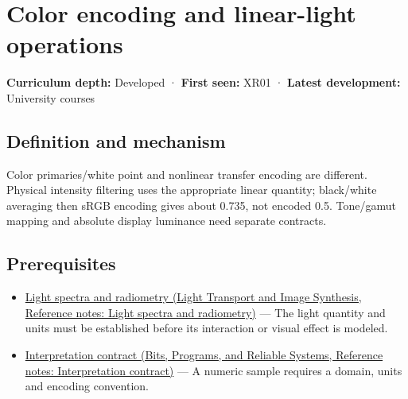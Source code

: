 \hypertarget{appendix-a9f83ad40792}{}\label{referencestart:appendix-a9f83ad40792}
\section{Color encoding and linear-light operations}\label{appendix-a9f83ad40792-color-encoding-and-linear-light-operations}

\hypertarget{appendix-a9f83ad40792-color-encoding-and-linear-light-operations}{}

\textbf{Curriculum depth:} Developed · \textbf{First seen:} XR01 · \textbf{Latest development:} University courses

\begin{allmightroledefinition}

\subsection{Definition and mechanism}\label{appendix-a9f83ad40792-definition-and-mechanism}

\hypertarget{appendix-a9f83ad40792-definition-and-mechanism}{}

Color primaries/white point and nonlinear transfer encoding are different. Physical intensity filtering uses the appropriate linear quantity; black/white averaging then sRGB encoding gives about 0.735, not encoded 0.5. Tone/gamut mapping and absolute display luminance need separate contracts.

\end{allmightroledefinition}

\subsection{Prerequisites}\label{appendix-a9f83ad40792-prerequisites}

\hypertarget{appendix-a9f83ad40792-prerequisites}{}

\begin{itemize}
\tightlist
\item
  \href{../04-Light-Transport-and-Image-Synthesis/main.pdf\#nameddest=appendix-215c2570199b}{Light spectra and radiometry (Light Transport and Image Synthesis, Reference notes: Light spectra and radiometry)} --- The light quantity and units must be established before its interaction or visual effect is modeled.
\item
  \href{../01-Bits-Programs-and-Reliable-Systems/main.pdf\#nameddest=appendix-f414bd4ed05c}{Interpretation contract (Bits, Programs, and Reliable Systems, Reference notes: Interpretation contract)} --- A numeric sample requires a domain, units and encoding convention.
\end{itemize}

